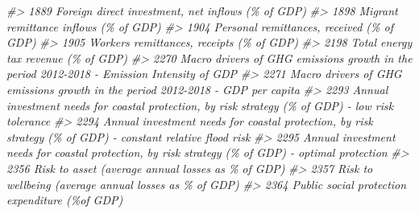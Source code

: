 \documentclass[
]{bxjsbook}
\newenvironment{Shaded}{\begin{snugshade}}{\end{snugshade}}
\newcommand{\CommentTok}[1]{\textcolor[rgb]{0.56,0.35,0.01}{\textit{#1}}}
\theoremstyle{definition}
\theoremstyle{definition}
\theoremstyle{definition}
\theoremstyle{definition}
\theoremstyle{remark}
\begin{document}
\begin{Shaded}
\begin{Highlighting}[]
\CommentTok{\#\textgreater{} 1889                                                                                                                          Foreign direct investment, net inflows (\% of GDP)}
\CommentTok{\#\textgreater{} 1898                                                                                                                                      Migrant remittance inflows (\% of GDP)}
\CommentTok{\#\textgreater{} 1904                                                                                                                                  Personal remittances, received (\% of GDP)}
\CommentTok{\#\textgreater{} 1905                                                                                                                                  Workers\textquotesingle{} remittances, receipts (\% of GDP)}
\CommentTok{\#\textgreater{} 2198                                                                                                                                        Total energy tax revenue (\% of GDP)}
\CommentTok{\#\textgreater{} 2270                                                                                  Macro drivers of GHG emissions growth in the period 2012{-}2018 {-} Emission Intensity of GDP}
\CommentTok{\#\textgreater{} 2271                                                                                             Macro drivers of GHG emissions growth in the period 2012{-}2018 {-} GDP per capita}
\CommentTok{\#\textgreater{} 2293                                                                           Annual investment needs for coastal protection, by risk strategy (\% of GDP) {-} low risk tolerance}
\CommentTok{\#\textgreater{} 2294                                                                 Annual investment needs for coastal protection, by risk strategy (\% of GDP) {-} constant relative flood risk}
\CommentTok{\#\textgreater{} 2295                                                                           Annual investment needs for coastal protection, by risk strategy (\% of GDP) {-} optimal protection}
\CommentTok{\#\textgreater{} 2356                                                                                                                          Risk to asset (average annual losses as \% of GDP)}
\CommentTok{\#\textgreater{} 2357                                                                                                                      Risk to wellbeing (average annual losses as \% of GDP)}
\CommentTok{\#\textgreater{} 2364                                                                                                                             Public social protection expenditure (\%of GDP)}

\end{Highlighting}
\end{Shaded}
\end{document}
